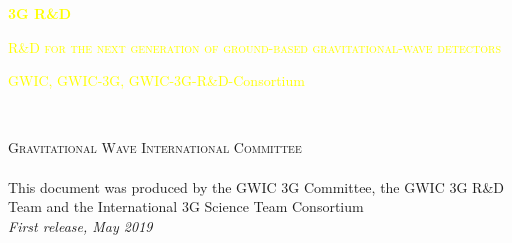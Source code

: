
\begingroup
\thispagestyle{empty}

\centering
\par\normalfont\fontsize{50}{50}\sffamily\selectfont
\textcolor{yellow}{\textbf{3G R\&D}}\\
\vskip6.5cm
\par\normalfont\fontsize{25}{25}\sffamily\selectfont
\textsc{\textcolor{yellow}{{R\&D for the next generation of ground-based gravitational-wave detectors}}}\par %
\vskip4cm
\textcolor{yellow}{\LARGE GWIC, GWIC-3G, GWIC-3G-R\&D-Consortium}\par %
\endgroup


\newpage
~\vfill
\thispagestyle{empty}


\noindent \textsc{Gravitational Wave International Committee}\\

\noindent \textsc{}\\ %

\noindent This document was produced by the GWIC 3G Committee, the GWIC 3G R\&D Team and the International 3G Science Team Consortium\\ %

\noindent \textit{First release, May 2019} %
\newpage


\pagestyle{empty} %
\tableofcontents %
\pagestyle{fancy} %
